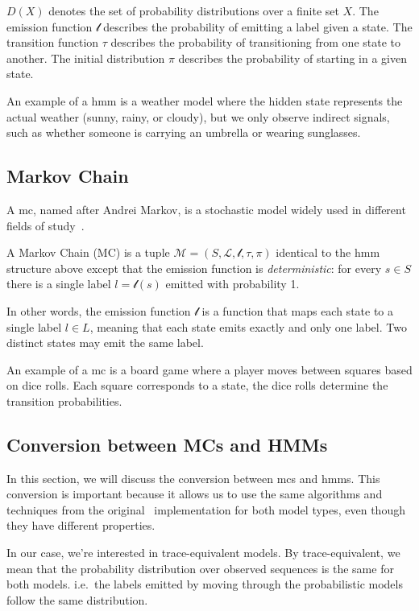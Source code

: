 $D(X)$ denotes the set of probability distributions over a finite set $X$.
The emission function $\mathscr{l}$ describes the probability of emitting a label given a state.
The transition function $\tau$ describes the probability of transitioning from one state to another.
The initial distribution $\pi$ describes the probability of starting in a given state.

An example of a \gls{hmm} is a weather model where the hidden state represents the actual weather (sunny, rainy, or cloudy), but we only observe indirect signals, such as whether someone is carrying an umbrella or wearing sunglasses.

\subsection{Markov Chain}\label{subsec:mc}
A \acrfull{mc}, named after Andrei Markov, is a stochastic model widely used in different fields of study~\cite{Rabiner89}.


\begin{definition}
    A Markov Chain (MC) is a tuple $\mathcal{M} = (S, \mathcal{L}, \mathscr{l}, \tau,  \pi)$ identical to the \gls{hmm} structure above except that the emission function is \emph{deterministic}: for every $s\in S$ there is a single label
    $l=\mathscr{l}(s)$ emitted with probability 1.
\end{definition}


In other words, the emission function $\mathscr{l}$ is a function that maps each state to a single label $l \in L$, meaning that each state emits exactly and only one label.
Two distinct states may emit the same label.

An example of a \gls{mc} is a board game where a player moves between squares based on dice rolls.
Each square corresponds to a state, the dice rolls determine the transition probabilities.

\subsection{Conversion between MCs and HMMs}\label{subsec:mc_hmm_conversion}
In this section, we will discuss the conversion between \glspl{mc} and \glspl{hmm}.
This conversion is important because it allows us to use the same algorithms and techniques from the original \Cupaal\ implementation for both model types, even though they have different properties.

In our case, we're interested in trace-equivalent models.
By trace-equivalent, we mean that the probability distribution over observed sequences is the same for both models.
i.e.\ the labels emitted by moving through the probabilistic models follow the same distribution.

